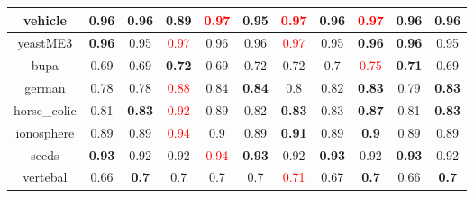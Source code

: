 \documentclass{article}%
\begin{document}
\begin{tabular}{c|cccccccccc}
\hline%
vehicle&0.96&0.96&0.89&\textcolor{red}{ 
0.97
}&0.95&\textcolor{red}{ 
0.97
}&0.96&\textcolor{red}{ 
0.97
}&0.96&0.96\\%
\hline%
yeastME3&\textbf{0.96}&0.95&\textcolor{red}{ 
0.97
}&0.96&0.96&\textcolor{red}{ 
0.97
}&0.95&\textbf{0.96}&\textbf{0.96}&0.95\\%
\hline%
bupa&0.69&0.69&\textbf{0.72}&0.69&0.72&0.72&0.7&\textcolor{red}{ 
0.75
}&\textbf{0.71}&0.69\\%
\hline%
german&0.78&0.78&\textcolor{red}{ 
0.88
}&0.84&\textbf{0.84}&0.8&0.82&\textbf{0.83}&0.79&\textbf{0.83}\\%
\hline%
horse\_colic&0.81&\textbf{0.83}&\textcolor{red}{ 
0.92
}&0.89&0.82&\textbf{0.83}&0.83&\textbf{0.87}&0.81&\textbf{0.83}\\%
\hline%
ionosphere&0.89&0.89&\textcolor{red}{ 
0.94
}&0.9&0.89&\textbf{0.91}&0.89&\textbf{0.9}&0.89&0.89\\%
\hline%
seeds&\textbf{0.93}&0.92&0.92&\textcolor{red}{ 
0.94
}&\textbf{0.93}&0.92&\textbf{0.93}&0.92&\textbf{0.93}&0.92\\%
\hline%
vertebal&0.66&\textbf{0.7}&0.7&0.7&0.7&\textcolor{red}{ 
0.71
}&0.67&\textbf{0.7}&0.66&\textbf{0.7}\\%
\hline%
\end{tabular}

%
\end{document}
